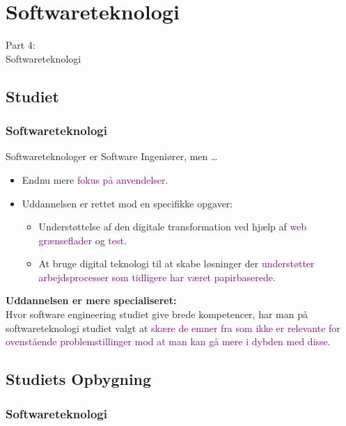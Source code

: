 {
\renewcommand{\bgcolor}{st}

\section{Softwareteknologi}
\begin{frame}
    \vspace{25mm}
    \begin{center}
        \Huge{Part 4:\\Softwareteknologi}
    \end{center}
\end{frame}

\subsection{Studiet}
\begin{frame}[fragile]
  \frametitle{Softwareteknologi }
  \vspace{3mm}
  Softwareteknologer er Software Ingeniører, men \ldots
  \begin{itemize}
    \item Endnu mere \textcolor{purple}{fokus på anvendelser}.
    \item Uddannelsen er rettet mod en specifikke opgaver:
      \begin{itemize}
        \item Understøttelse af den digitale transformation ved hjælp af \textcolor{purple}{web grænseflader} og \textcolor{purple}{test}.
        \item At bruge digital teknologi til at skabe løsninger der \textcolor{purple}{understøtter arbejdsprocesser som tidligere har været papirbaserede}.
      \end{itemize}
  \end{itemize}
  
  \pause
  \vspace{5mm}
  \textbf{Uddannelsen er mere specialiseret:} \\
  Hvor software engineering studiet give brede kompetencer, har man på softwareteknologi studiet valgt at \textcolor{purple}{skære de emner fra som ikke er relevante for ovenstående problemstillinger mod at man kan gå mere i dybden med disse}.
\end{frame}

\subsection{Studiets Opbygning}
\begin{frame}[fragile]
  \frametitle{Softwareteknologi }
  \vspace{-2mm}
  

\end{frame}}
